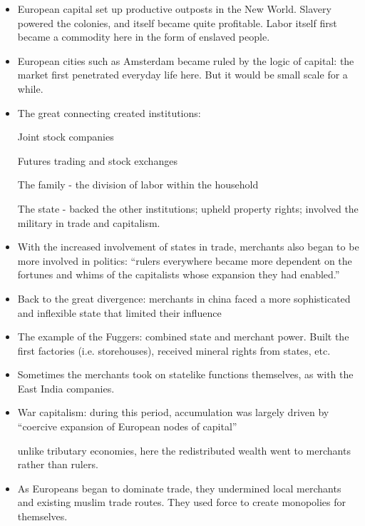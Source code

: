 \documentclass[a4paper,12pt]{article}
\begin{document}
\begin{itemize}
\item European capital set up productive outposts in the New World. Slavery powered the colonies, and itself became quite profitable. Labor itself first became a commodity here in the form of enslaved people.

\item European cities such as Amsterdam became ruled by the logic of capital: the market first penetrated everyday life here. But it would be small scale for a while.

\item The great connecting created institutions:

\subitem Joint stock companies

\subitem Futures trading and stock exchanges

\subitem The family - the division of labor within the household

\subitem The state - backed the other institutions; upheld property rights; involved the military in trade and capitalism.

\item With the increased involvement of states in trade, merchants also began to be more involved in politics: ``rulers everywhere became more dependent on the fortunes and whims of the capitalists whose expansion they had enabled.''

\item Back to the great divergence: merchants in china faced a more sophisticated and inflexible state that limited their influence

\item The example of the Fuggers: combined state and merchant power. Built the first factories (i.e. storehouses), received mineral rights from states, etc.

\item Sometimes the merchants took on statelike functions themselves, as with the East India companies. 

\item War capitalism: during this period, accumulation was largely driven by ``coercive expansion of European nodes of capital''

\subitem unlike tributary economies, here the redistributed wealth went to merchants rather than rulers.

\item As Europeans began to dominate trade, they undermined local merchants and existing muslim trade routes. They used force to create monopolies for themselves.

\end{itemize}
\end{document}
